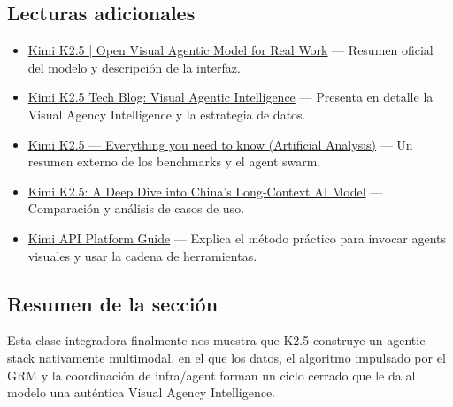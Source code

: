 \subsection{Lecturas adicionales}
\begin{itemize}
    \item \href{https://www.kimi.com/ai-models/kimi-k2-5/}{Kimi K2.5 | Open Visual Agentic Model for Real Work} — Resumen oficial del modelo y descripción de la interfaz.
    \item \href{https://www.kimi.com/blog/kimi-k2-5}{Kimi K2.5 Tech Blog: Visual Agentic Intelligence} — Presenta en detalle la Visual Agency Intelligence y la estrategia de datos.
    \item \href{https://artificialanalysis.ai/articles/kimi-k2-5-everything-you-need-to-know}{Kimi K2.5 — Everything you need to know (Artificial Analysis)} — Un resumen externo de los benchmarks y el agent swarm.
    \item \href{https://futuretechdiaries.com/article.php?slug=kimi-k2-5-a-deep-dive-into-chinas-long-context-ai-model}{Kimi K2.5: A Deep Dive into China’s Long-Context AI Model} — Comparación y análisis de casos de uso.
    \item \href{https://platform.kimi.ai/docs/guide}{Kimi API Platform Guide} — Explica el método práctico para invocar agents visuales y usar la cadena de herramientas.
\end{itemize}

\subsection{Resumen de la sección}
Esta clase integradora finalmente nos muestra que K2.5 construye un agentic stack nativamente multimodal, en el que los datos, el algoritmo impulsado por el GRM y la coordinación de infra/agent forman un ciclo cerrado que le da al modelo una auténtica Visual Agency Intelligence.


